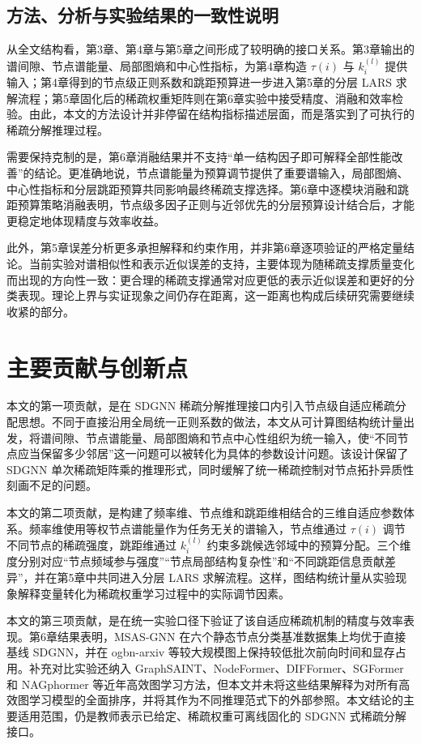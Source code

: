 \subsection{方法、分析与实验结果的一致性说明}\label{subsec:ch7-loop}

从全文结构看，第3章、第4章与第5章之间形成了较明确的接口关系。第3章输出的谱间隙、节点谱能量、局部图熵和中心性指标，为第4章构造 $\tau(i)$ 与 $k_i^{(l)}$ 提供输入；第4章得到的节点级正则系数和跳距预算进一步进入第5章的分层 LARS 求解流程；第5章固化后的稀疏权重矩阵则在第6章实验中接受精度、消融和效率检验。由此，本文的方法设计并非停留在结构指标描述层面，而是落实到了可执行的稀疏分解推理过程。

需要保持克制的是，第6章消融结果并不支持“单一结构因子即可解释全部性能改善”的结论。更准确地说，节点谱能量为预算调节提供了重要谱输入，局部图熵、中心性指标和分层跳距预算共同影响最终稀疏支撑选择。第6章中逐模块消融和跳距预算策略消融表明，节点级多因子正则与近邻优先的分层预算设计结合后，才能更稳定地体现精度与效率收益。

此外，第5章误差分析更多承担解释和约束作用，并非第6章逐项验证的严格定量结论。当前实验对谱相似性和表示近似误差的支持，主要体现为随稀疏支撑质量变化而出现的方向性一致：更合理的稀疏支撑通常对应更低的表示近似误差和更好的分类表现。理论上界与实证现象之间仍存在距离，这一距离也构成后续研究需要继续收紧的部分。

\section{主要贡献与创新点}\label{sec:ch7-contributions}

本文的第一项贡献，是在 SDGNN 稀疏分解推理接口内引入节点级自适应稀疏分配思想。不同于直接沿用全局统一正则系数的做法，本文从可计算图结构统计量出发，将谱间隙、节点谱能量、局部图熵和节点中心性组织为统一输入，使“不同节点应当保留多少邻居”这一问题可以被转化为具体的参数设计问题。该设计保留了 SDGNN 单次稀疏矩阵乘的推理形式，同时缓解了统一稀疏控制对节点拓扑异质性刻画不足的问题。

本文的第二项贡献，是构建了频率维、节点维和跳距维相结合的三维自适应参数体系。频率维使用等权节点谱能量作为任务无关的谱输入，节点维通过 $\tau(i)$ 调节不同节点的稀疏强度，跳距维通过 $k_i^{(l)}$ 约束多跳候选邻域中的预算分配。三个维度分别对应“节点频域参与强度”“节点局部结构复杂性”和“不同跳距信息贡献差异”，并在第5章中共同进入分层 LARS 求解流程。这样，图结构统计量从实验现象解释变量转化为稀疏权重学习过程中的实际调节因素。

本文的第三项贡献，是在统一实验口径下验证了该自适应稀疏机制的精度与效率表现。第6章结果表明，MSAS-GNN 在六个静态节点分类基准数据集上均优于直接基线 SDGNN，并在 ogbn-arxiv 等较大规模图上保持较低批次前向时间和显存占用。补充对比实验还纳入 GraphSAINT、NodeFormer、DIFFormer、SGFormer 和 NAGphormer 等近年高效图学习方法，但本文并未将这些结果解释为对所有高效图学习模型的全面排序，并将其作为不同推理范式下的外部参照。本文结论的主要适用范围，仍是教师表示已给定、稀疏权重可离线固化的 SDGNN 式稀疏分解接口。

